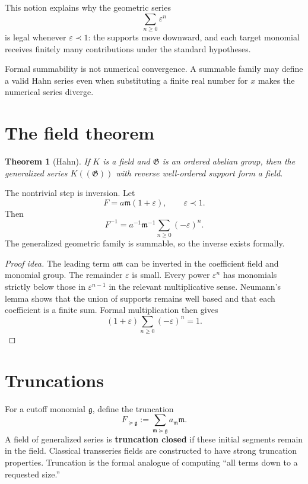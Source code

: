 \documentclass[11pt,openany]{book}
\theoremstyle{plain}
\newtheorem{theorem}{Theorem}[chapter]
\theoremstyle{definition}
\theoremstyle{remark}
\newcommand{\G}{\mathfrak{G}}
\newcommand{\m}{\mathfrak{m}}
\newcommand{\g}{\mathfrak{g}}
\newcommand{\defterm}[1]{\textbf{#1}}
\begin{document}
This notion explains why the geometric series
\[
  \sum_{n\ge0}\varepsilon^n
\]
is legal whenever $\varepsilon\prec1$: the supports move downward, and each target monomial receives finitely many contributions under the standard hypotheses.

\begin{warningbox}
Formal summability is not numerical convergence. A summable family may define a valid Hahn series even when substituting a finite real number for $x$ makes the numerical series diverge.
\end{warningbox}

\section{The field theorem}
\begin{theorem}[Hahn]
If $K$ is a field and $\G$ is an ordered abelian group, then the generalized series $K((\G))$ with reverse well-ordered support form a field.
\end{theorem}

The nontrivial step is inversion. Let
\[
  F=a\m(1+\varepsilon),
  \qquad \varepsilon\prec1.
\]
Then
\[
  F^{-1}=a^{-1}\m^{-1}
  \sum_{n\ge0}(-\varepsilon)^n.
\]
The generalized geometric family is summable, so the inverse exists formally.

\begin{proof}[Proof idea]
The leading term $a\m$ can be inverted in the coefficient field and monomial group. The remainder $\varepsilon$ is small. Every power $\varepsilon^n$ has monomials strictly below those in $\varepsilon^{n-1}$ in the relevant multiplicative sense. Neumann's lemma shows that the union of supports remains well based and that each coefficient is a finite sum. Formal multiplication then gives
\[
  (1+\varepsilon)\sum_{n\ge0}(-\varepsilon)^n=1.
\]
\end{proof}

\section{Truncations}
For a cutoff monomial $\g$, define the truncation
\[
  F_{\succeq\g}:=
  \sum_{\m\succeq\g}a_{\m}\m.
\]
A field of generalized series is \defterm{truncation closed} if these initial segments remain in the field. Classical transseries fields are constructed to have strong truncation properties. Truncation is the formal analogue of computing ``all terms down to a requested size.''
\end{document}
